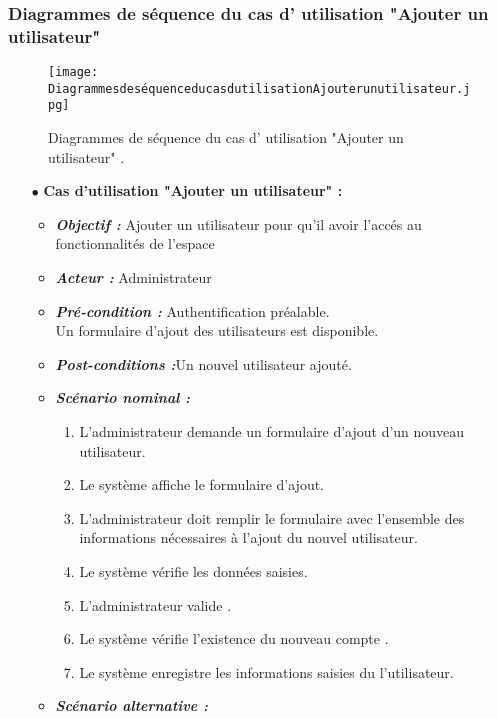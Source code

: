 \subsubsection{Diagrammes de séquence du cas d' utilisation "Ajouter un utilisateur" }
\begin{figure}[ht]
	\centering
	\texttt{[image: DiagrammesdeséquenceducasdutilisationAjouterunutilisateur.jpg]}
	\caption{Diagrammes de séquence du cas d' utilisation "Ajouter un utilisateur"  .}
	\label{fig:Diagrammes de séquence du cas d' utilisation Ajouter un utilisateur  }
\end{figure}
\FloatBarrier
{}
\begin{itemize}
	\item[$\bullet$] \textbf{Cas d’utilisation "Ajouter un utilisateur" :} 
	\medskip
	\begin{itemize}
		\item \textit{\textbf{Objectif :}} Ajouter un utilisateur pour qu’il avoir l’accés au fonctionnalités de l’espace	
		\item \textit{\textbf{Acteur :}} Administrateur	
		\item \textit{\textbf{Pré-condition  :}} Authentification préalable.\\
		Un formulaire d’ajout des utilisateurs est disponible.
		\item \textit{\textbf{Post-conditions   :}}Un nouvel utilisateur ajouté.
		\item \textit{\textbf{Scénario nominal :}}
		\begin{enumerate}
			\item L’administrateur demande un formulaire d’ajout d’un nouveau utilisateur.
			\item Le système affiche le formulaire d’ajout.
			\item L’administrateur doit remplir le formulaire avec l’ensemble des informations
			nécessaires à l’ajout du nouvel utilisateur. 
			\item Le système vérifie les données saisies. 
			\item  L’administrateur valide . 
			\item  Le système vérifie l’existence du nouveau compte .  
			\item Le système enregistre les informations saisies du l’utilisateur.
		\end{enumerate}
		\item \textit{\textbf{Scénario alternative :}}
		\begin{enumerate}

\end{enumerate}
\end{itemize}
\end{itemize}
